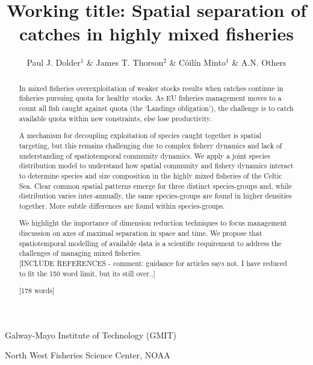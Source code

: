 \documentclass{nature}
\title{Working title: Spatial separation of catches in highly mixed fisheries}
\author{Paul J. Dolder$^1$ \& James T. Thorson$^2$ \& Cóilín Minto$^1$ \& A.N.
Others}
\begin{document}
\maketitle

\begin{affiliations}
\item Galway-Mayo Institute of Technology (GMIT) 
\item North West Fisheries Science Center, NOAA
\end{affiliations}

\begin{linenumbers}

\begin{abstract} 
In mixed fisheries overexploitation of weaker stocks results when catches
continue in fisheries pursuing quota for healthy stocks. As EU fisheries
management moves to a count all fish caught against quota (the `Landings
obligation'), the challenge is to catch available quota within new constraints,
else lose productivity.  

A mechanism for decoupling exploitation of species caught together is spatial
targeting, but this remains challenging due to complex fishery dynamics and
lack of understanding of spatiotemporal community dynamics. We apply a joint
species distribution model to understand how spatial community and fishery
dynamics interact to determine species and size composition in the highly mixed
fisheries of the Celtic Sea. Clear common spatial patterns emerge for three
distinct species-groups and, while distribution varies inter-annually, the same
species-groups are found in higher densities together. More subtle differences
are found within species-groups.

We highlight the importance of dimension reduction techniques to focus
management discussion on axes of maximal separation in space and time. We
propose that spatiotemporal modelling of available data is a scientific
requirement to address the challenges of managing mixed fisheries. \\ 


[INCLUDE REFERENCES - comment: guidance for articles says not. I have reduced
to fit the 150 word limit, but its still over..]

[178 words]

\end{abstract}

\section*{}


\end{linenumbers}
\end{document}
